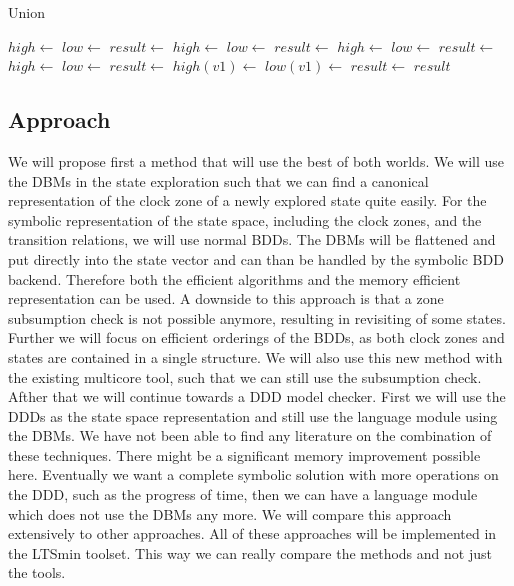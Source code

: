 \documentclass[11pt]{article}
\begin{document}
\begin{algorithm}
\begin{algorithmic}[1]
\caption{Union}\label{alg:union}
		\State $high \gets$ 
		\State $low \gets$ 
		\State $result \gets$  
		\State $high \gets$ 
		\State $low \gets$ 
		\State $result \gets$  
		\State $high \gets$ 
		\State $low \gets$ 
		\State $result \gets$ 
		\State $high \gets$ 
		\State $low \gets$ 
		\State $result \gets$ 
		\State $high(v1) \gets$ 
		\State $low(v1) \gets$ 
		\State $result \gets$ 
	\EndIf
	\State \Return $result$
\EndProcedure
\end{algorithmic}
\end{algorithm}

\subsection{Approach}
We will propose first a method that will use the best of both worlds. We will use the DBMs in the state exploration such that we can find a canonical representation of the clock zone of a newly explored state quite easily. For the symbolic representation of the state space, including the clock zones, and the transition relations, we will use normal BDDs. The DBMs will be flattened and put directly into the state vector and can than be handled by the symbolic BDD backend. Therefore both the efficient algorithms and the memory efficient representation can be used. A downside to this approach is that a zone subsumption check is not possible anymore, resulting in revisiting of some states. Further we will focus on efficient orderings of the BDDs, as both clock zones and states are contained in a single structure. We will also use this new method with the existing multicore tool, such that we can still use the subsumption check. Afther that we will continue towards a DDD model checker. First we will use the DDDs as the state space representation and still use the language module using the DBMs. We have not been able to find any literature on the combination of these techniques. There might be a significant memory improvement possible here. Eventually we want a complete symbolic solution with more operations on the DDD, such as the progress of time, then we can have a language module which does not use the DBMs any more. We will compare this approach extensively to other approaches. All of these approaches will be implemented in the LTSmin toolset. This way we can really compare the methods and not just the tools.
\end{document}
